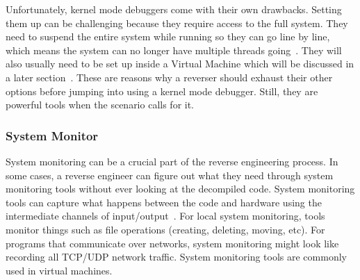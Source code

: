 Unfortunately, kernel mode debuggers come with their own drawbacks. 
Setting them up can be challenging because they require access to the full system. 
They need to suspend the entire system while running so they can go line by line, which means the system can no longer have multiple threads going~\cite{Reversing}. 
They will also usually need to be set up inside a Virtual Machine which will be discussed in a later section~\cite{PracticalRE}. 
These are reasons why a reverser should exhaust their other options before jumping into using a kernel mode debugger. 
Still, they are powerful tools when the scenario calls for it.

\subsubsection{System Monitor}
System monitoring can be a crucial part of the reverse engineering process. 
In some cases, a reverse engineer can figure out what they need through system monitoring tools without ever looking at the decompiled code. 
System monitoring tools can capture what happens between the code and hardware using the intermediate channels of input/output~\cite{Reversing}. 
For local system monitoring, tools monitor things such as file operations (creating, deleting, moving, etc). 
For programs that communicate over networks, system monitoring might look like recording all TCP/UDP network traffic. 
System monitoring tools are commonly used in virtual machines.



